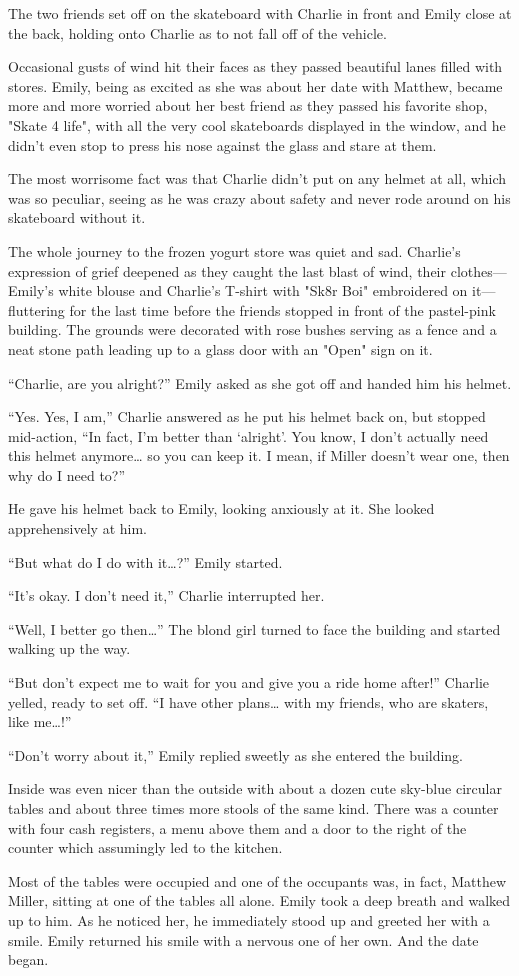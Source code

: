 The two friends set off on the skateboard with Charlie in front and Emily close at the back, holding onto Charlie as to not fall off of the vehicle.

Occasional gusts of wind hit their faces as they passed beautiful lanes filled with stores. Emily, being as excited as she was about her date with Matthew, became more and more worried about her best friend as they passed his favorite shop, "Skate 4 life", with all the very cool skateboards displayed in the window, and he didn't even stop to press his nose against the glass and stare at them.

The most worrisome fact was that Charlie didn’t put on any helmet at all, which was so peculiar, seeing as he was crazy about safety and never rode around on his skateboard without it.

The whole journey to the frozen yogurt store was quiet and sad. Charlie’s expression of grief deepened as they caught the last blast of wind, their clothes—Emily’s white blouse and Charlie’s T-shirt with "Sk8r Boi" embroidered on it—fluttering for the last time before the friends stopped in front of the pastel-pink building. The grounds were decorated with rose bushes serving as a fence and a neat stone path leading up to a glass door with an "Open" sign on it.

“Charlie, are you alright?” Emily asked as she got off and handed him his helmet.

“Yes. Yes, I am,” Charlie answered as he put his helmet back on, but stopped mid-action, “In fact, I’m better than ‘alright’. You know, I don’t actually need this helmet anymore… so you can keep it. I mean, if Miller doesn’t wear one, then why do I need to?”

He gave his helmet back to Emily, looking anxiously at it. She looked apprehensively at him.

“But what do I do with it…?” Emily started.

“It’s okay. I don’t need it,” Charlie interrupted her.

“Well, I better go then…” The blond girl turned to face the building and started walking up the way.

“But don’t expect me to wait for you and give you a ride home after!” Charlie yelled, ready to set off. “I have other plans… with my friends, who are skaters, like me…!”

“Don’t worry about it,” Emily replied sweetly as she entered the building.

Inside was even nicer than the outside with about a dozen cute sky-blue circular tables and about three times more stools of the same kind. There was a counter with four cash registers, a menu above them and a door to the right of the counter which assumingly led to the kitchen.

Most of the tables were occupied and one of the occupants was, in fact, Matthew Miller, sitting at one of the tables all alone. Emily took a deep breath and walked up to him. As he noticed her, he immediately stood up and greeted her with a smile. Emily returned his smile with a nervous one of her own. And the date began.